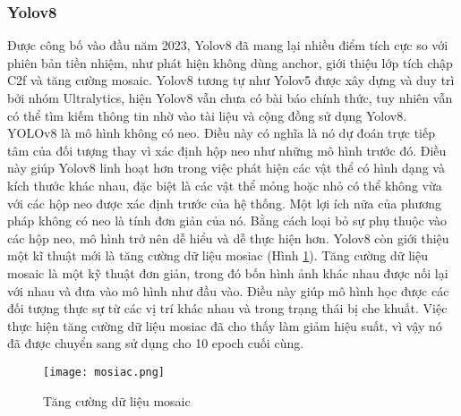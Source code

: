 \documentclass[../the.tex]{subfiles}
\begin{document}
\subsubsection{Yolov8} 
{\fontsize{13}{12} \selectfont 
Được công bố vào đầu năm 2023, Yolov8 đã mang lại nhiều điểm tích cực so với phiên bản tiền nhiệm, như phát hiện không dùng anchor, giới thiệu lớp tích chập C2f và tăng cường mosaic.
Yolov8 tương tự như Yolov5 được xây dựng và duy trì bởi nhóm Ultralytics, hiện Yolov8 vẫn chưa có bài báo chính thức, tuy nhiên vẫn có thể tìm kiếm thông tin nhờ vào tài liệu và cộng đồng sử dụng Yolov8.
YOLOv8 là mô hình không có neo. Điều này có nghĩa là nó dự đoán trực tiếp tâm của đối tượng thay vì xác định hộp neo như những mô hình trước đó.
Điều này giúp Yolov8 linh hoạt hơn trong việc phát hiện các vật thể có hình dạng và kích thước khác nhau, đặc biệt là các vật thể mỏng hoặc nhỏ có thể không vừa với các hộp neo được xác định trước của hệ thống. 
Một lợi ích nữa của phương pháp không có neo là tính đơn giản của nó. Bằng cách loại bỏ sự phụ thuộc vào các hộp neo, mô hình trở nên dễ hiểu và dễ thực hiện hơn.
Yolov8 còn giới thiệu một kĩ thuật mới là tăng cường dữ liệu mosiac (Hình \ref{fig:mosaic}). Tăng cường dữ liệu mosaic là một kỹ thuật đơn giản, trong đó bốn hình ảnh khác nhau được nối lại với nhau và đưa vào mô hình như đầu vào. Điều này giúp mô hình học được các đối tượng thực sự từ các vị trí khác nhau và trong trạng thái bị che khuất.
Việc thực hiện tăng cường dữ liệu mosiac đã cho thấy làm giảm hiệu suất, vì vậy nó đã được chuyển sang sử dụng cho 10 epoch cuối cùng.
}
\begin{figure}[H]
	\centering
	\texttt{[image: mosiac.png]}
	\caption{Tăng cường dữ liệu mosaic}
	\label{fig:mosaic}
\end{figure}
\bigskip
\end{document}
